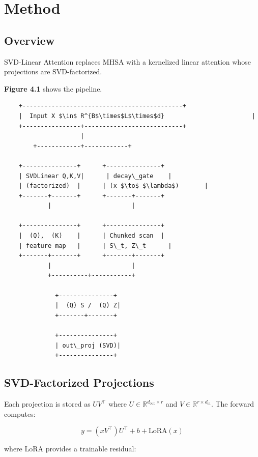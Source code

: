 
\section{Method}

\subsection{Overview}

SVD-Linear Attention replaces MHSA with a kernelized linear attention 
whose projections are SVD-factorized.

\textbf{Figure 4.1} shows the pipeline.

\begin{lstlisting}
    +--------------------------------------------+
    |  Input X $\in$ R^{B$\times$L$\times$d}                        |
    +----------------+---------------------------+
                     |
        +------------+------------+
                                   
    +---------------+      +---------------+
    | SVDLinear Q,K,V|      | decay\_gate    |
    | (factorized)  |      | (x $\to$ $\lambda$)       |
    +-------+-------+      +-------+-------+
            |                      |
                                    
    +---------------+      +---------------+
    |  (Q),  (K)    |      | Chunked scan  |
    | feature map   |      | S\_t, Z\_t      |
    +-------+-------+      +-------+-------+
            |                      |
            +----------+-----------+
                        
              +---------------+
              |  (Q) S /  (Q) Z|
              +-------+-------+
                       
              +---------------+
              | out\_proj (SVD)|
              +---------------+
\end{lstlisting}

\subsection{SVD-Factorized Projections}

Each projection is stored as $U V^\top$ where $U \in \mathbb{R}^{d_\text{out} \times r}$ 
and $V \in \mathbb{R}^{r \times d_\text{in}}$. The forward computes:

\[
y = (x V^\top) U^\top + b + \text{LoRA}(x)
\tag{4.1}
\]

where LoRA provides a trainable residual:

